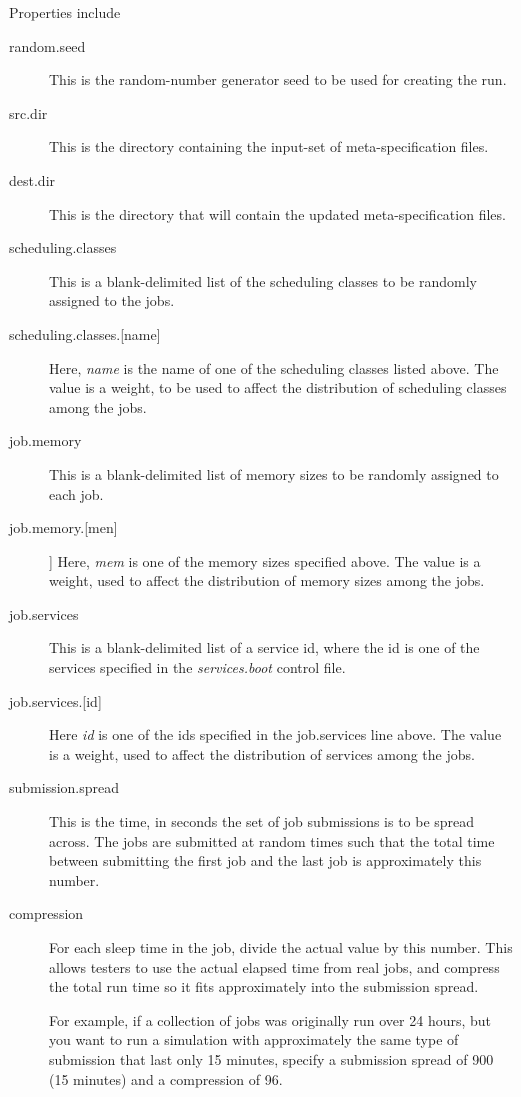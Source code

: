      Properties include
     \begin{description}
       \item[random.seed] This is the random-number generator seed to be used for
         creating the run.
       \item[src.dir] This is the directory containing the input-set of meta-specification
         files.
       \item[dest.dir] This is the directory that will contain the updated meta-specification
         files.
       \item[scheduling.classes] This is a blank-delimited list of the scheduling classes to
         be randomly assigned to the jobs.  
       \item[scheduling.classes.{[name]}] Here, {\em name} is the name of one of the 
         scheduling classes listed above.  The value is a weight, to be used to affect
         the distribution of scheduling classes among the jobs.
       \item[job.memory] This is a blank-delimited list of memory sizes to be randomly
         assigned to each job.
       \item[job.memory.{[men]}]] Here, {\em mem} is one of the memory sizes specified
         above.  The value is a weight, used to affect the distribution of memory sizes
         among the jobs.
       \item[job.services] This is a blank-delimited list of a service id, where the id
         is one of the services specified in the {\em services.boot} control file.
       \item[job.services.{[id]}] Here {\em id} is one of the ids specified in the
         job.services line above.  The value is a weight, used to affect the distribution
         of services among the jobs.

       \item[submission.spread]  This is the time, in seconds the set of job submissions
         is to be spread across.  The jobs are submitted at random times such that the
         total time between submitting the first job and the last job is approximately
         this number.
       \item[compression] For each sleep time in the job, divide the actual value by 
         this number.  This allows testers to use the actual elapsed time from real
         jobs, and compress the total run time so it fits approximately into the submission
         spread.

         For example, if a collection of jobs was originally run over 24 hours, but 
         you want to run a simulation with approximately the same type of submission
         that last only 15 minutes, specify a submission spread of 900 (15 minutes) and
         a compression of 96.
     \end{description}

